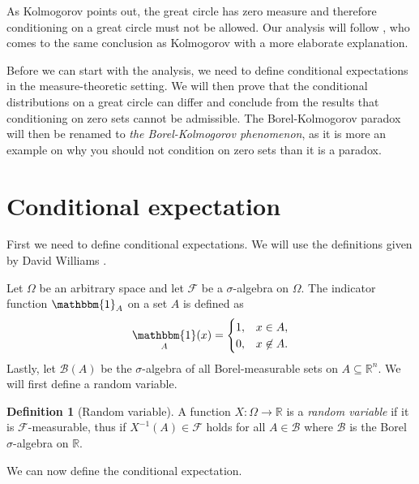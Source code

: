 \documentclass[twoside,a4paper]{report}
\theoremstyle{plain}
\theoremstyle{definition}
\newtheorem{definition}[theorem]{Definition}
\theoremstyle{remark}
\numberwithin{equation}{chapter}
\newcommand{\R}{\mathbb{R}}
\DeclareMathOperator{\1}{\mathbbm{1}}
\newcommand{\F}{\mathcal{F}}
\newcommand{\B}{\mathcal{B}}
\begin{document}
As Kolmogorov \cite{Kolmogorov33} points out, the great circle has zero measure and therefore conditioning on a great circle must not be allowed. Our analysis will follow \cite{Gyenis17}, who comes to the same conclusion as Kolmogorov with a more elaborate explanation.

Before we can start with the analysis, we need to define conditional expectations in the measure-theoretic setting. We will then prove that the conditional distributions on a great circle can differ and conclude from the results that conditioning on zero sets cannot be admissible. The Borel-Kolmogorov paradox will then be renamed to \emph{the Borel-Kolmogorov phenomenon}, as it is more an example on why you should not condition on zero sets than it is a paradox.

\section{Conditional expectation}
First we need to define conditional expectations. We will use the definitions given by David Williams \cite{Williams91}.

Let $\Omega$ be an arbitrary space and let $\mathcal{F}$ be a $\sigma$-algebra on $\Omega$. The indicator function $\1_A$ on a set $A$ is defined as
\begin{equation}
\1_A(x)=\begin{cases}1,&x\in A,\\0,&x\not\in A.\end{cases}
\end{equation}
Lastly, let $\B(A)$ be the $\sigma$-algebra of all Borel-measurable sets on $A\subseteq\R^n$. We will first define a random variable.

\begin{definition}[Random variable]
A function $X\colon\Omega\to\R$ is a \emph{random variable} if it is $\F$-measurable, thus if $X^{-1}(A)\in\F$ holds for all $A\in\B$ where $\B$ is the Borel $\sigma$-algebra on $\R$.
\end{definition}

We can now define the conditional expectation.
\end{document}
